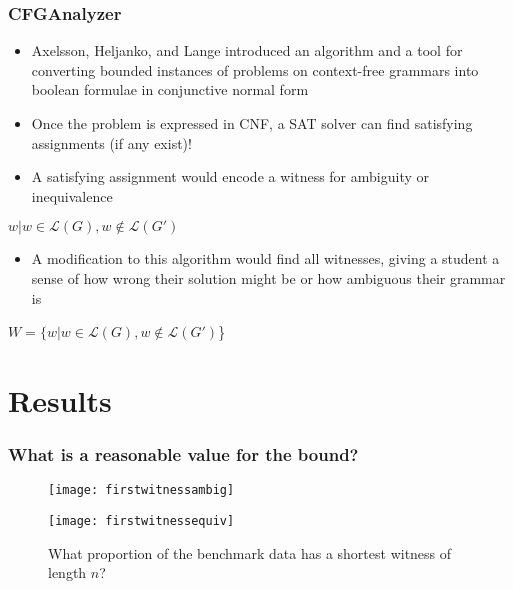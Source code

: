 \documentclass{beamer}
\begin{document}
\begin{frame}
\frametitle {CFGAnalyzer}
\begin{itemize}
\item Axelsson, Heljanko, and Lange introduced an algorithm and a tool  for converting bounded instances of problems on context-free grammars into boolean formulae in conjunctive normal form 

\vspace{0.1in}
\end{itemize}


{\begin{itemize} 
\item Once the problem is expressed in CNF, a SAT solver can find satisfying assignments (if any exist)! 
\vspace{0.1in}
\item A satisfying assignment would encode a witness for ambiguity or inequivalence
\end{itemize}
\centering $w | w \in \mathcal{L}(G), w \not \in \mathcal{L}(G')$}

{\begin{itemize}
\item A modification to this algorithm would find all witnesses, giving a student a sense of how wrong their solution might be or how ambiguous their grammar is 
\end{itemize}
\centering $W =\{w | w \in \mathcal{L}(G), w \not \in \mathcal{L}(G')$\}}

\end{frame}

\section{Results}

\begin{frame}
\frametitle{What is a reasonable value for the bound?}
\begin{figure}[H]
	\centering
	\begin{minipage}{0.49\textwidth}
		\centering
		\texttt{[image: firstwitnessambig]}
	\end{minipage}
	\begin{minipage}{0.49\textwidth}
		\centering
		\texttt{[image: firstwitnessequiv]}
	\end{minipage}
	\caption*{What proportion of the benchmark data has a shortest witness of length $n$?}
\end{figure}
\end{frame}
\end{document}

